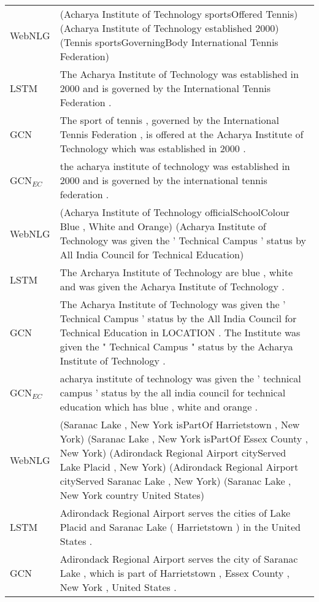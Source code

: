 \documentclass[11pt,a4paper,dvipsnames]{article}
\begin{document}
\begin{table*}[t]
\begin{small}
 \begin{tabular}{|@{~}p{1.0cm}p{14.5cm}@{~}|}
  \hline
WebNLG &  (Acharya Institute of Technology sportsOffered Tennis) (Acharya Institute of Technology established 2000) (Tennis sportsGoverningBody International Tennis Federation)\\  
  LSTM & The Acharya Institute of Technology was established in 2000 and is governed by the International Tennis Federation .\\
  GCN &  The sport of tennis , governed by the International Tennis Federation , is offered at the Acharya Institute of Technology which was established in 2000 .\\
  GCN$_{EC}$ & the acharya institute of technology was established in 2000 and is governed by the international tennis federation .\\  
  \hline
WebNLG & (Acharya Institute of Technology officialSchoolColour Blue , White and Orange) (Acharya Institute of Technology was given the ' Technical Campus ' status by All India Council for Technical Education)\\
  LSTM & The Archarya Institute of Technology are blue , white and was given the Acharya Institute of Technology .\\
  GCN & The Acharya Institute of Technology was given the ' Technical Campus ' status by the All India Council for Technical Education in LOCATION . The Institute was given the " Technical Campus " status by the Acharya Institute of Technology .\\
  GCN$_{EC}$ & acharya institute of technology was given the ' technical campus ' status by the all india council for technical education which has blue , white and orange .\\
  \hline
WebNLG &  (Saranac Lake , New York isPartOf Harrietstown , New York) (Saranac Lake , New York isPartOf Essex County , New York) (Adirondack Regional Airport cityServed Lake Placid , New York) (Adirondack Regional Airport cityServed Saranac Lake , New York)  (Saranac Lake , New York country United States)\\  
  LSTM & Adirondack Regional Airport serves the cities of Lake Placid and Saranac Lake ( Harrietstown ) in the United States . \\ 
  GCN & Adirondack Regional Airport serves the city of Saranac Lake , which is part of Harrietstown , Essex County , New York , United States . \\  

\end{tabular}
\end{small}
\end{table*}
\end{document}
